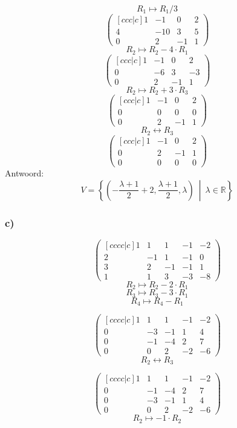 \documentclass[lineaire_algebra_oplossingen.tex]{subfiles}
\begin{document}
\[ R_1 \longmapsto R_1 / 3\]
\[
\begin{pmatrix}[ccc|c]
1 & -1 & 0 & 2\\
4 & -10 & 3 & 5\\
0 & 2 & -1 & 1
\end{pmatrix}
\]
\[ R_2 \longmapsto R_2 - 4\cdot R_1\]
\[
\begin{pmatrix}[ccc|c]
1 & -1 & 0 & 2\\
0 & -6 & 3 & -3\\
0 & 2 & -1 & 1
\end{pmatrix}
\]
\[ R_2 \longmapsto R_2 + 3\cdot R_3\]
\[
\begin{pmatrix}[ccc|c]
1 & -1 & 0 & 2\\
0 & 0 & 0 & 0\\
0 & 2 & -1 & 1
\end{pmatrix}
\]
\[ R_2 \leftrightarrow R_3\]
\[
\begin{pmatrix}[ccc|c]
1 & -1 & 0 & 2\\
0 & 2 & -1 & 1\\
0 & 0 & 0 & 0
\end{pmatrix}
\]
Antwoord:
\[
V = \left\{\left( -\frac{\lambda+1}{2} + 2,\frac{\lambda+1}{2},\lambda \right)\ \middle|\ \lambda \in \mathbb{R} \right\}
\]

\subsubsection*{c)}
\[
\begin{pmatrix}[cccc|c]
1 & 1 & 1 &-1&-2\\
2 & -1 & 1 & -1 & 0\\
3 & 2 & -1 & -1 & 1\\
1 & 1 & 3 & -3 & -8
\end{pmatrix}
\]
\[ R_2 \longmapsto R_2 - 2\cdot R_1\]
\[ R_3 \longmapsto R_3 - 3\cdot R_1\]
\[ R_4 \longmapsto R_4 - R_1\]

\[
\begin{pmatrix}[cccc|c]
1 & 1 & 1 & -1 & -2\\
0 & -3 & -1 & 1 & 4\\
0 & -1 & -4 & 2 & 7\\
0 & 0 & 2 & -2 & -6
\end{pmatrix}
\]
\[ R_2 \leftrightarrow R_3\]

\[
\begin{pmatrix}[cccc|c]
1 & 1 & 1 & -1 & -2\\
0 & -1 & -4 & 2 & 7\\
0 & -3 & -1 & 1 & 4\\
0 & 0 & 2 & -2 & -6
\end{pmatrix}
\]
\[ R_2 \longmapsto  -1\cdot R_2\]
\end{document}

